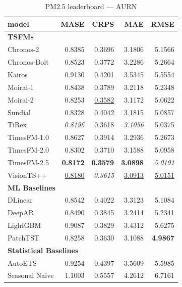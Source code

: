 \begin{table}[H]
\caption{PM2.5 leaderboard --- AURN}
\centering
\begin{small}
\begin{tabular}{lrrrr}
\toprule
model & MASE & CRPS & MAE & RMSE \\
\midrule
\multicolumn{5}{l}{\textbf{TSFMs}} \\
Chronos-2 & 0.8385 & 0.3696 & 3.1806 & 5.1566 \\
Chronos-Bolt & 0.8523 & 0.3772 & 3.2286 & 5.2664 \\
Kairos & 0.9130 & 0.4201 & 3.5345 & 5.5554 \\
Moirai-1 & 0.8438 & 0.3789 & 3.2118 & 5.2348 \\
Moirai-2 & 0.8253 & \underline{0.3582} & 3.1172 & 5.0622 \\
Sundial & 0.8328 & 0.4042 & 3.1815 & 5.0857 \\
TiRex & \textit{0.8196} & 0.3618 & \textit{3.1056} & 5.0375 \\
TimesFM-1.0 & 0.8627 & 0.3914 & 3.2936 & 5.2673 \\
TimesFM-2.0 & 0.8302 & 0.3710 & 3.1588 & 5.0958 \\
TimesFM-2.5 & \textbf{0.8172} & \textbf{0.3579} & \textbf{3.0898} & \textit{5.0191} \\
VisionTS++ & \underline{0.8180} & \textit{0.3615} & \underline{3.0913} & \underline{5.0151} \\
\midrule
\multicolumn{5}{l}{\textbf{ML Baselines}} \\
DLinear & 0.8542 & 0.4022 & 3.3123 & 5.1084 \\
DeepAR & 0.8490 & 0.3845 & 3.2414 & 5.2341 \\
LightGBM & 0.9087 & 0.3829 & 3.4312 & 5.6275 \\
PatchTST & 0.8258 & 0.3630 & 3.1088 & \textbf{4.9867} \\
\midrule
\multicolumn{5}{l}{\textbf{Statistical Baselines}} \\
AutoETS & 0.9254 & 0.4397 & 3.5609 & 5.5985 \\
Seasonal Naive & 1.1003 & 0.5557 & 4.2612 & 6.7161 \\
\bottomrule
\end{tabular}
\end{small}
\end{table}
